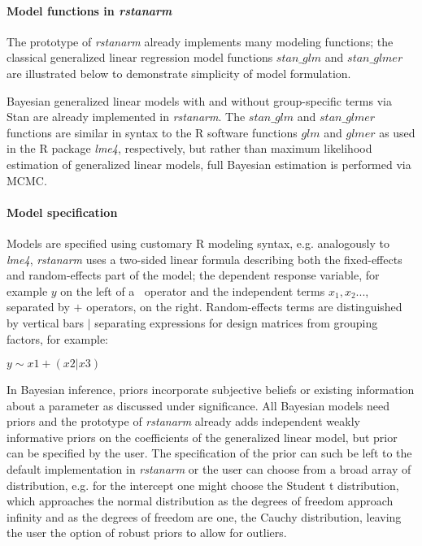 \documentclass[11pt,notitlepage]{article}
\begin{document}
\paragraph*{Model functions in \textit{rstanarm}}
The prototype of \textit{rstanarm} already implements many modeling functions; the classical generalized linear regression model functions $stan\_glm$ and $stan\_glmer$ are illustrated below to demonstrate simplicity of model formulation.  

Bayesian generalized linear models with and without group-specific terms via Stan are already implemented in \textit{rstanarm}. The $stan\_glm$ and $stan\_glmer$ functions are similar in syntax to the R software functions $glm$ and $glmer$ as used in the R package \textit{lme4}, respectively, but rather than maximum likelihood estimation of generalized linear models, full Bayesian estimation is performed  via MCMC. 

\paragraph*{Model specification}

Models are specified using customary R modeling syntax, e.g. analogously to \textit{lme4}, \textit{rstanarm} uses a two-sided linear formula describing both the fixed-effects and random-effects part of the model; the dependent response variable, for example $y$ on the left of a $~$ operator and the independent terms $x_1, x_2...$, separated by $+$ operators, on the right. Random-effects terms are distinguished by vertical bars $|$ separating expressions for design matrices from grouping factors, for example:

$y \sim x1 +(x2|x3)$

In Bayesian inference, priors incorporate subjective beliefs or existing information about a parameter as discussed under significance. All Bayesian models need priors and the prototype of \textit{rstanarm} already adds independent weakly informative priors on the coefficients of the generalized linear model, but prior can be specified by the user. The specification of the prior can such be left to the default implementation in \textit{rstanarm} or the user can choose from a broad array of distribution, e.g. for the intercept one might choose the Student t distribution, which approaches the normal distribution as the degrees of freedom approach infinity and as the degrees of freedom are one, the Cauchy distribution, leaving the user the option of robust priors to allow for outliers. 
\end{document}
